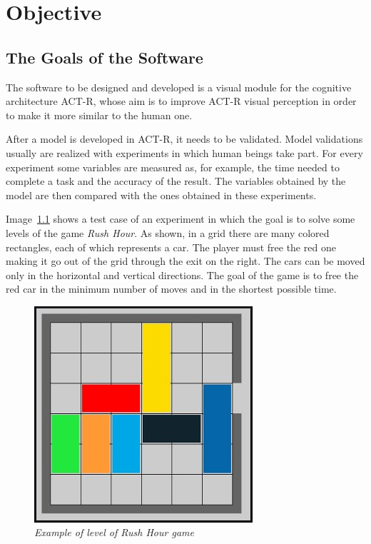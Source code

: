 \chapter{Objective}

	\section{The Goals of the Software}
	The software to be designed and developed is a visual module for the cognitive architecture ACT-R, whose aim is to improve ACT-R visual perception in order to make it more similar to the human one. 
	
	After a model is developed in ACT-R, it needs to be validated. Model validations usually are realized with experiments in which human beings take part. For every experiment some variables are measured as, for example, the time needed to complete a task and the accuracy of the result. The variables obtained by the model are then compared with the ones obtained in these experiments.
 
	Image~\ref{fig:RushHourHuman} shows a test case of an experiment in which the goal is to solve some levels of the game \emph{Rush Hour}. As shown, in a grid there are many colored rectangles, each of which represents a car. The player must free the red one making it go out of the grid through the exit on the right. The cars can be moved only in the horizontal and vertical directions. The goal of the game is to free the red car in the minimum number of moves and in the shortest possible time.

	\begin{figure}[!h]
	  \begin{center} 
	    \includegraphics[scale=0.6]{images/ch_03/originale.jpg}	
	  \end{center} 
	  \caption{\textit{Example of level of Rush Hour game}}
	  \label{fig:RushHourHuman}	
  	\end{figure}
	
